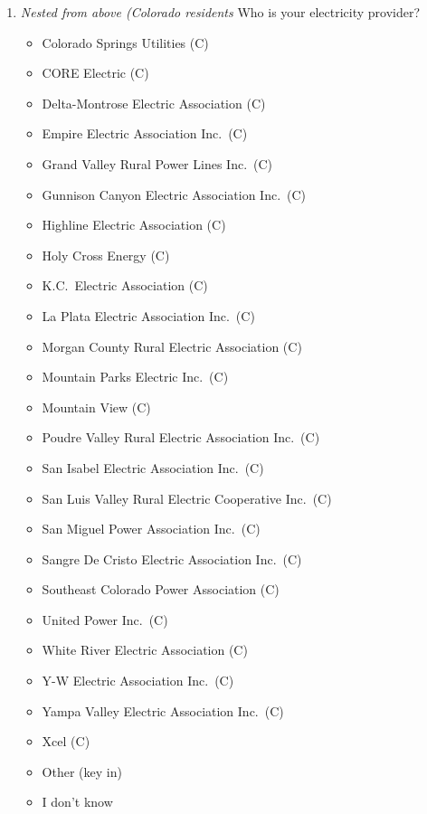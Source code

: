 \documentclass{article}
\begin{document}
\begin{enumerate}
\item \textit{Nested from above (Colorado residents} Who is your electricity provider?
\begin{itemize}
  \item[\checkbox] Colorado Springs Utilities (C)
  \item[\checkbox] CORE Electric (C)
  \item[\checkbox] Delta-Montrose Electric Association (C)
  \item[\checkbox] Empire Electric Association Inc.\ (C)
  \item[\checkbox] Grand Valley Rural Power Lines Inc.\ (C)
  \item[\checkbox] Gunnison Canyon Electric Association Inc.\ (C)
  \item[\checkbox] Highline Electric Association (C)
  \item[\checkbox] Holy Cross Energy (C)
  \item[\checkbox] K.C.\ Electric Association (C)
  \item[\checkbox] La Plata Electric Association Inc.\ (C)
  \item[\checkbox] Morgan County Rural Electric Association (C)
  \item[\checkbox] Mountain Parks Electric Inc.\ (C)
  \item[\checkbox] Mountain View (C)
  \item[\checkbox] Poudre Valley Rural Electric Association Inc.\ (C)
  \item[\checkbox] San Isabel Electric Association Inc.\ (C)
  \item[\checkbox] San Luis Valley Rural Electric Cooperative Inc.\ (C)
  \item[\checkbox] San Miguel Power Association Inc.\ (C)
  \item[\checkbox] Sangre De Cristo Electric Association Inc.\ (C)
  \item[\checkbox] Southeast Colorado Power Association (C)
  \item[\checkbox] United Power Inc.\ (C)
  \item[\checkbox] White River Electric Association (C)
  \item[\checkbox] Y-W Electric Association Inc.\ (C)
  \item[\checkbox] Yampa Valley Electric Association Inc.\ (C)
  \item[\checkbox] Xcel (C)
  \item[\checkbox] Other (key in)
  \item[\checkbox] I don't know
\end{itemize}
 


\end{enumerate}
\end{document}
